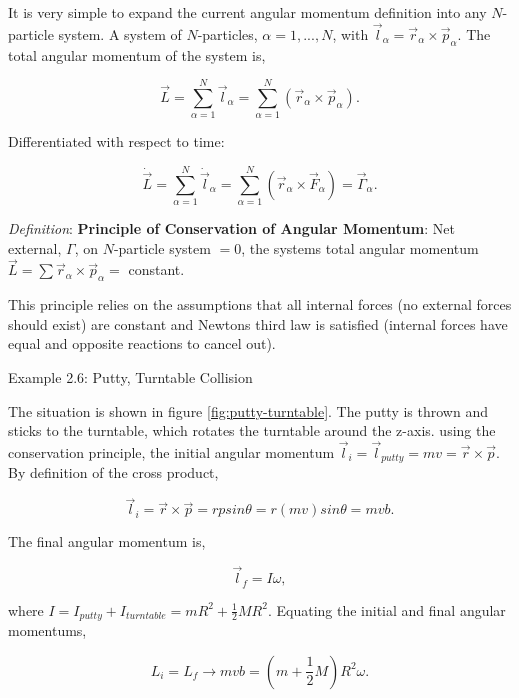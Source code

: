 It is very simple to expand the current angular momentum definition into any $N$-particle system. A system of $N$-particles, $\alpha = 1, ... , N$, with $\vec{l}_\alpha = \vec{r}_\alpha \times \vec{p}_\alpha$. The total angular momentum of the system is,

\begin{equation*}
    \vec{L} = \sum^N_{\alpha = 1} \vec{l}_\alpha = \sum^N_{\alpha = 1} (\vec{r}_\alpha \times \vec{p}_\alpha).
\end{equation*}

Differentiated with respect to time:

\begin{equation*}
    \dot{\vec{L}} = \sum^N_{\alpha = 1} \dot{\vec{l}}_\alpha = \sum^N_{\alpha = 1} (\vec{r}_\alpha \times \vec{F}_\alpha) = \vec{\Gamma}_\alpha.
\end{equation*}

{\itshape Definition}: {\bfseries Principle of Conservation of Angular Momentum}: Net external, $\Gamma$, on $N$-particle system $=0$, the systems total angular momentum $\vec{L} = \sum \vec{r}_\alpha \times \vec{p}_\alpha = $ constant.

This principle relies on the assumptions that all internal forces (no external forces should exist) are constant and Newtons third law is satisfied (internal forces have equal and opposite reactions to cancel out).

{\exbegin Example 2.6: Putty, Turntable Collision}

The situation is shown in figure \ref{fig:putty-turntable}. The putty is thrown and sticks to the turntable, which rotates the turntable around the z-axis. using the conservation principle, the initial angular momentum $\vec{l}_i = \vec{l}_{putty} = mv = \vec{r} \times \vec{p}$. By definition of the cross product,

\begin{equation*}
    \vec{l}_i = \vec{r} \times \vec{p} = rpsin\theta = r(mv)sin\theta = mvb.
\end{equation*}

The final angular momentum is,

\begin{equation*}
    \vec{l}_f = I\omega,
\end{equation*}

\noindent where $I = I_{putty} + I_{turntable} = mR^2 + \frac{1}{2}MR^2$. Equating the initial and final angular momentums,

\begin{equation*}
    L_{i} = L_f \rightarrow mvb = (m+ \frac{1}{2}M)R^2\omega.
\end{equation*}

